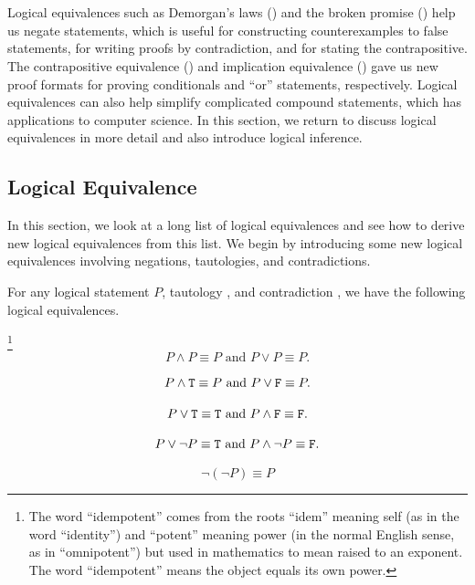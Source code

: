 \section{\secinference}
\label{sec_inference}

Logical equivalences such as Demorgan's laws () and the broken promise () help us negate statements, which is useful for constructing counterexamples to false statements, for writing proofs by contradiction, and for stating the contrapositive.  The contrapositive equivalence () and implication equivalence () gave us new proof formats for proving conditionals and ``or'' statements, respectively. Logical equivalences can also help simplify complicated compound statements, which has applications to computer science. In this section, we return to discuss logical equivalences in more detail and also introduce logical inference. 

\newcommand{\subequiv}{Logical Equivalence}
\subsection{\subequiv}
\label{sub_logical_equiv}

In this section, we look at a long list of logical equivalences and see how to derive new logical equivalences from this list.  We begin by introducing some new logical equivalences involving negations, tautologies, and contradictions.

\begin{thm}
\label{thm_obvious_logical_equivalences}  
    For any logical statement $P$, tautology , and contradiction , we have the following logical equivalences.
        \begin{apart}
            \item \label{part_equiv_idem} \footnote{The word ``idempotent'' comes from the roots ``idem'' meaning self (as in the word ``identity'') and ``potent'' meaning power (in the normal English sense, as in ``omnipotent'') but used in mathematics to mean raised to an exponent. The word ``idempotent'' means the object equals its own power.}
                $$P \land P \equiv P\text{ and }P \lor P \equiv P.$$
            \item \label{part_equiv_id} 
                $$P \land \texttt{T} \equiv P\text{ and }P \lor \texttt{F} \equiv P.$$
            \item \label{part_equiv_dom} 
                $$P \lor \texttt{T} \equiv \texttt{T}\text{ and }P \land \texttt{F}  \equiv \texttt{F}.$$
            \item \label{part_equiv_neg} 
                $$P \lor \neg P \equiv \texttt{T}\text{ and }P \land \neg P \equiv \texttt{F}.$$
            \item \label{part_equiv_doubleneg} 
                $$\neg (\neg P) \equiv P$$
        \end{apart}
\end{thm}

